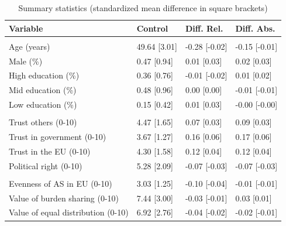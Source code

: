 \documentclass[
  12pt,
  a4paper,
]{article}
\begin{document}
\begin{table}
\centering
\caption{\label{tab:summary}Summary statistics (standardized mean difference in square brackets)}
\centering
\begin{tabu} to 
\toprule
Variable & Control & Diff. Rel. & Diff. Abs.\\
\midrule
\addlinespace[0.3em]
\\
\hspace{1em}Age (years) & 49.64 [3.01] & -0.28 [-0.02] & -0.15 [-0.01]\\
\hspace{1em}Male (\%) & 0.47 [0.94] & 0.01 [0.03] & 0.02 [0.03]\\
\hspace{1em}High education (\%) & 0.36 [0.76] & -0.01 [-0.02] & 0.01 [0.02]\\
\hspace{1em}Mid education (\%) & 0.48 [0.96] & 0.00 [0.00] & -0.01 [-0.01]\\
\hspace{1em}Low education (\%) & 0.15 [0.42] & 0.01 [0.03] & -0.00 [-0.00]\\
\addlinespace[0.3em]
\\
\hspace{1em}Trust others (0-10) & 4.47 [1.65] & 0.07 [0.03] & 0.09 [0.03]\\
\hspace{1em}Trust in government (0-10) & 3.67 [1.27] & 0.16 [0.06] & 0.17 [0.06]\\
\hspace{1em}Trust in the EU (0-10) & 4.30 [1.58] & 0.12 [0.04] & 0.12 [0.04]\\
\hspace{1em}Political right (0-10) & 5.28 [2.09] & -0.07 [-0.03] & -0.07 [-0.03]\\
\addlinespace[0.3em]
\\
\hspace{1em}Evenness of AS in EU (0-10) & 3.03 [1.25] & -0.10 [-0.04] & -0.01 [-0.01]\\
\hspace{1em}Value of burden sharing (0-10) & 7.44 [3.00] & -0.03 [-0.01] & 0.03 [0.01]\\
\hspace{1em}Value of equal distribution (0-10) & 6.92 [2.76] & -0.04 [-0.02] & -0.02 [-0.01]\\

\end{tabu}
\end{table}
\end{document}
